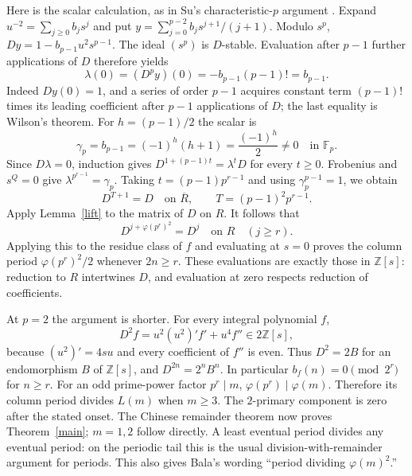 \documentclass[11pt]{article}
\begin{document}
Here is the scalar calculation, as in Su's characteristic-$p$ argument
\cite[Theorem 2.2]{su}. Expand
$u^{-2}=\sum_{j\ge0}b_js^j$ and put
$y=\sum_{j=0}^{p-2}b_js^{j+1}/(j+1)$.
Modulo $s^p$, $Dy=1-b_{p-1}u^2s^{p-1}$.
The ideal $(s^p)$ is $D$-stable. Evaluation after $p-1$ further
applications of $D$ therefore yields
\[
 \lambda(0)=(D^py)(0)=-b_{p-1}(p-1)!=b_{p-1}.
\]
Indeed $Dy(0)=1$, and a series of order $p-1$ acquires constant
term $(p-1)!$ times its leading coefficient after $p-1$
applications of $D$; the last equality is Wilson's theorem.
For $h=(p-1)/2$ the scalar is
\begin{equation}\label{gamma}
 \gamma_p=b_{p-1}=(-1)^h(h+1)=\frac{(-1)^h}{2}\ne0
 \quad\text{in }\mathbb F_p.
\end{equation}
Since $D\lambda=0$, induction gives
$D^{1+(p-1)t}=\lambda^tD$ for every $t\ge0$.
Frobenius and $s^Q=0$ give $\lambda^{p^{r-1}}=\gamma_p$.
Taking $t=(p-1)p^{r-1}$ and using
$\gamma_p^{p-1}=1$, we obtain
\[
 D^{T+1}=D\quad\text{on }\overline R,\qquad
 T=(p-1)^2p^{r-1}.
\]
Apply Lemma~\ref{lift} to the matrix of $D$ on $R$. It follows that
\begin{equation}\label{oddperiod}
 D^{j+\varphi(p^r)^2}=D^j\quad\text{on }R
 \quad(j\ge r).
\end{equation}
Applying this to the residue class of $f$ and evaluating at $s=0$
proves the column period $\varphi(p^r)^2/2$ whenever $2n\ge r$.
These evaluations are exactly those in $\mathbb Z[s]$: reduction to $R$
intertwines $D$, and evaluation at zero respects reduction of coefficients.

At $p=2$ the argument is shorter. For every integral polynomial $f$,
\[
 D^2f=u^2(u^2)'f'+u^4f''\in2\mathbb Z[s],
\]
because $(u^2)'=4su$ and every coefficient of $f''$ is even.
Thus $D^2=2B$ for an endomorphism $B$ of $\mathbb Z[s]$, and
$D^{2n}=2^nB^n$. In particular $b_f(n)=0\pmod{2^r}$ for $n\ge r$.
For an odd prime-power factor $p^r\mid m$,
$\varphi(p^r)\mid\varphi(m)$. Therefore its column period divides
$L(m)$ when $m\ge3$. The $2$-primary component is zero after
the stated onset. The Chinese remainder theorem now proves
Theorem~\ref{main}; $m=1,2$ follow directly. A least eventual period
divides any eventual period: on the periodic tail this is the usual
division-with-remainder argument for periods. This also gives Bala's
wording ``period dividing $\varphi(m)^2$.''
\end{document}

